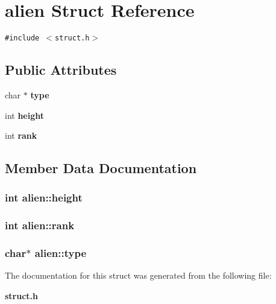 \section{alien Struct Reference}
\label{structalien}
{\tt \#include $<$struct.h$>$}

\subsection*{Public Attributes}
\begin{CompactItemize}
\item 
char $\ast$ \bf{type}
\item 
int \bf{height}
\item 
int \bf{rank}
\end{CompactItemize}


\subsection{Member Data Documentation}
\subsubsection{\setlength{\rightskip}{0pt plus 5cm}int \bf{alien::height}}\label{structalien_211dfe352cc8d09dab06433c1ac79869}


\subsubsection{\setlength{\rightskip}{0pt plus 5cm}int \bf{alien::rank}}\label{structalien_931030b20515d6d0c96e35adc53398b1}


\subsubsection{\setlength{\rightskip}{0pt plus 5cm}char$\ast$ \bf{alien::type}}\label{structalien_49a02ba03d5db0fe6e3e196d2c7c6865}




The documentation for this struct was generated from the following file:\begin{CompactItemize}
\item 
\bf{struct.h}\end{CompactItemize}

